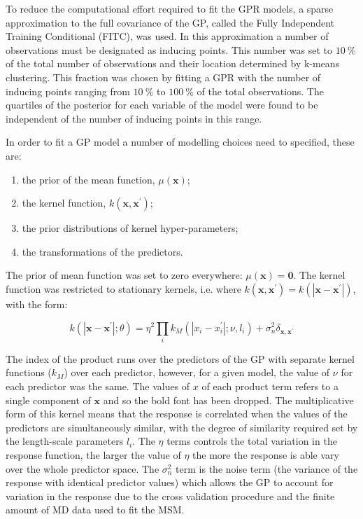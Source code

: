 To reduce the computational effort required to fit the GPR models, a sparse approximation to the full covariance of the GP, called the Fully Independent Training Conditional (FITC)\cite{quinonero-candelaUnifyingViewSparse2005}, was used. In this approximation a number of observations must be designated as inducing points. This number was set to $\SI{10}{\percent}$ of the total number of observations and their location determined by k-means clustering. This fraction was chosen by fitting a GPR with the number of inducing points ranging from $\SI{10}{\percent}$ to $\SI{100}{\percent}$ of the total observations. The quartiles of the posterior for each variable of the model were found to be independent of the number of inducing points in this range.  

In order to fit a GP model a number of modelling choices need to specified, these are: 
\begin{enumerate}
    \item the prior of the mean function, $\mu(\mathbf{x})$;
    \item the kernel function, $k(\mathbf{x}, \mathbf{x}^{\prime})$;
    \item the prior distributions of kernel hyper-parameters;
    \item the transformations of the predictors.
\end{enumerate}

The prior of mean function  was set to zero everywhere: $\mu(\mathbf{x})=\mathbf{0}$. The kernel function was restricted to stationary kernels, i.e. where $k(\mathbf{x}, \mathbf{x}^{\prime}) = k(|\mathbf{x} - \mathbf{x}^{\prime}|)$, with the form: 

\begin{equation}\label{eqn:kernel_form}
    k(|\mathbf{x}-\mathbf{x}^{\prime}|; \theta) = 
    \eta^{2}\prod_i k_{M}(|x_{i}-x_{i}^{\prime}|; \nu, l_i)
    +\sigma_{n}^{2}\delta_{\mathbf{x}, \mathbf{x}^{\prime}}
\end{equation}

The index of the product runs over the predictors of the GP with separate kernel functions ($k_{M}$) over each predictor, however, for a given model, the value of $\nu$ for each predictor was the same. The values of $x$ of each product term refers to a single component of $\mathbf{x}$ and so the bold font has been dropped. The multiplicative form of this kernel means that the response is correlated when the values of the predictors are simultaneously similar, with the degree of similarity required set by the length-scale parameters $l_{i}$.  The $\eta$ terms controls the total variation in the response function, the larger the value of $\eta$ the more the response is able vary over the whole predictor space. The $\sigma_{n}^{2}$ term is the noise term (the variance of the response with identical predictor values) which allows the GP to account for variation in the response due to the cross validation procedure and the finite amount of MD data used to fit the MSM. 

